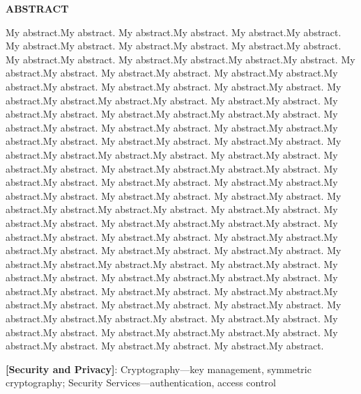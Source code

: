 \begin{center}
\Large{\textbf{ABSTRACT}}\\
\end{center}
My abstract.My abstract. My abstract.My abstract. My abstract.My abstract. My abstract.My abstract. My abstract.My abstract. My abstract.My abstract. My abstract.My abstract. My abstract.My abstract.My abstract.My abstract. My abstract.My abstract. My abstract.My abstract. My abstract.My abstract.My abstract.My abstract. My abstract.My abstract. My abstract.My abstract. My abstract.My abstract.My abstract.My abstract. My abstract.My abstract. My abstract.My abstract. My abstract.My abstract.My abstract.My abstract. My abstract.My abstract. My abstract.My abstract. My abstract.My abstract.My abstract.My abstract. My abstract.My abstract. My abstract.My abstract. My abstract.My abstract.My abstract.My abstract. My abstract.My abstract. My abstract.My abstract. My abstract.My abstract.My abstract.My abstract. My abstract.My abstract. My abstract.My abstract. My abstract.My abstract.My abstract.My abstract. My abstract.My abstract. My abstract.My abstract. My abstract.My abstract.My abstract.My abstract. My abstract.My abstract. My abstract.My abstract. My abstract.My abstract.My abstract.My abstract. My abstract.My abstract. My abstract.My abstract. My abstract.My abstract.My abstract.My abstract. My abstract.My abstract. My abstract.My abstract. My abstract.My abstract.My abstract.My abstract. My abstract.My abstract. My abstract.My abstract. My abstract.My abstract.My abstract.My abstract. My abstract.My abstract. My abstract.My abstract. My abstract.My abstract.My abstract.My abstract. My abstract.My abstract. My abstract.My abstract. My abstract.My abstract.My abstract.My abstract. My abstract.My abstract. My abstract.My abstract. My abstract.My abstract.My abstract.My abstract. My abstract.My abstract. My abstract.My abstract. My abstract.My abstract.

\par 
\textbf{[Security and Privacy]}: Cryptography—key management, symmetric cryptography; Security Services—authentication, access control

